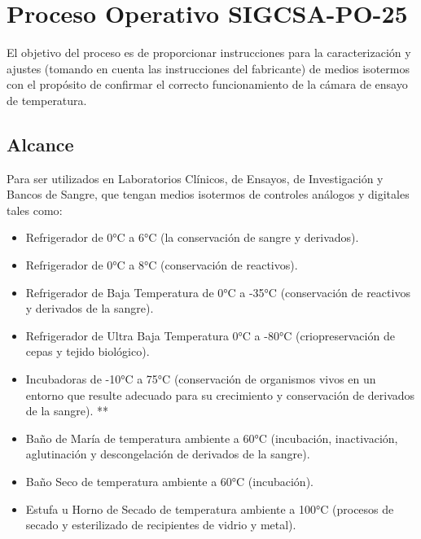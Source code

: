 \section{Proceso Operativo SIGCSA-PO-25}

\par 
El objetivo del proceso es de proporcionar instrucciones para la caracterización y ajustes (tomando en cuenta las instrucciones
del fabricante) de medios isotermos con el propósito de confirmar el correcto funcionamiento de
la cámara de ensayo de temperatura\cite{po25}.

\subsection{Alcance}
\par 
Para ser utilizados en Laboratorios Clínicos, de Ensayos, de Investigación y Bancos de Sangre, que
tengan medios isotermos de controles análogos y digitales tales como\cite{po25}:

\begin{itemize}
	\item Refrigerador de 0°C a 6°C (la conservación de sangre y derivados).
	
	\item Refrigerador de 0°C a 8°C (conservación de reactivos).
	
	\item Refrigerador de Baja Temperatura de 0°C a -35°C (conservación de reactivos y derivados
	de la sangre).
	
	\item Refrigerador de Ultra Baja Temperatura 0°C a -80°C (criopreservación de cepas y tejido
	biológico).
	
	\item Incubadoras de -10°C a 75°C (conservación de organismos vivos en un entorno que
	resulte adecuado para su crecimiento y conservación de derivados de la sangre). **
	
	\item Baño de María de temperatura ambiente a 60°C (incubación, inactivación, aglutinación y
	descongelación de derivados de la sangre).
	
	\item Baño Seco de temperatura ambiente a 60°C (incubación).
	
	\item Estufa u Horno de Secado de temperatura ambiente a 100°C (procesos de secado y
	esterilizado de recipientes de vidrio y metal).
\end{itemize}

